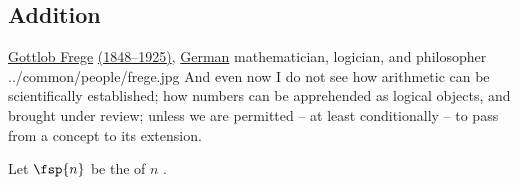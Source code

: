 \subsection{Addition}
\qboxnpq
  {\href{http://en.wikipedia.org/wiki/Frege}{Gottlob Frege}
   \href{http://www-history.mcs.st-andrews.ac.uk/Timelines/TimelineF.html}{(1848--1925)},
   \href{http://www-history.mcs.st-andrews.ac.uk/BirthplaceMaps/Places/Germany.html}{German} mathematician, logician, and philosopher
   \footnotemark
  }
  {../common/people/frege.jpg}
  {And even now I do not see how arithmetic can be scientifically established;
   how numbers can be apprehended as logical objects, and brought under review;
   unless we are permitted -- at least conditionally --
   to pass from a concept to its extension.}

\begin{definition}
\label{def:N+}
Let $\fsp{n}$ be the  of $n$ .
\end{definition}


